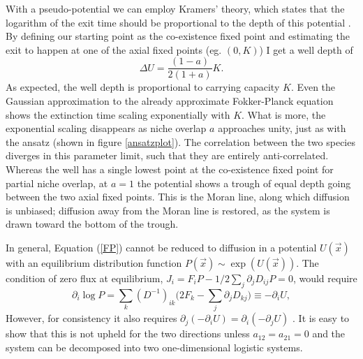 With a pseudo-potential we can employ Kramers' theory, which states that the logarithm of the exit time should be proportional to the depth of this potential \cite{Hanggi1990}. 
By defining our starting point as the co-existence fixed point and estimating the exit to happen at one of the axial fixed points (eg. $(0,K)$) I get a well depth of
\begin{equation}
\Delta U = \frac{(1-a)}{2(1+a)}K. 
\end{equation}
As expected, the well depth is proportional to carrying capacity $K$. 
Even the Gaussian approximation to the already approximate Fokker-Planck equation shows the extinction time scaling exponentially with $K$. 
What is more, the exponential scaling disappears as niche overlap $a$ approaches unity, just as with the ansatz (shown in figure \ref{ansatzplot}). 
The correlation between the two species diverges in this parameter limit, such that they are entirely anti-correlated. 
Whereas the well has a single lowest point at the co-existence fixed point for partial niche overlap, at $a=1$ the potential shows a trough of equal depth going between the two axial fixed points. 
This is the Moran line, along which diffusion is unbiased; diffusion away from the Moran line is restored, as the system is drawn toward the bottom of the trough. 

\fi%

In general, Equation (\ref{FP}) cannot be reduced to diffusion in a potential $U(\vec{x})$ with an equilibrium distribution function $P(\vec{x})\sim \exp(U(\vec{x}))$. The condition of zero flux at equilibrium, $J_i=F_iP - 1/2 \sum_{j}\partial_j D_{ij}P=0$, would require \cite{Gardiner2004}
\begin{equation*}
\partial_i \log P = \sum_k (D^{-1})_{ik} \big( 2 F_k - \sum_j \partial_j D_{kj} \big) \equiv - \partial_i U,
\end{equation*}
However, for consistency it also requires $\partial_j \left( - \partial_i U \right) = \partial_i \left( - \partial_j U \right)$ \cite{Gardiner2004}. 
It is easy to show that this is not upheld for the two directions unless $a_{12}=a_{21}=0$ and the system can be decomposed into two one-dimensional logistic systems.


